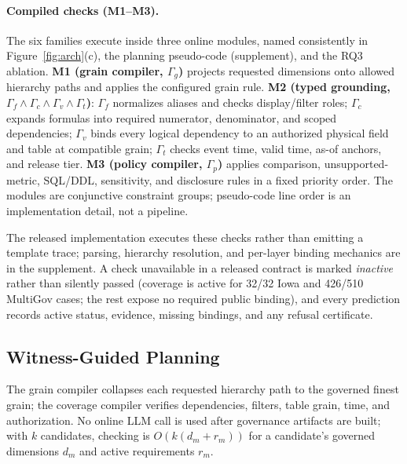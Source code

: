 \documentclass[letterpaper]{article}
\begin{document}
\paragraph{Compiled checks (M1--M3).}
The six families execute inside three online modules, named consistently in Figure~\ref{fig:arch}(c), the planning pseudo-code (supplement), and the RQ3 ablation. \textbf{M1 (grain compiler, $\Gamma_g$)} projects requested dimensions onto allowed hierarchy paths and applies the configured grain rule. \textbf{M2 (typed grounding, $\Gamma_f\land\Gamma_c\land\Gamma_v\land\Gamma_t$)}: $\Gamma_f$ normalizes aliases and checks display/filter roles; $\Gamma_c$ expands formulas into required numerator, denominator, and scoped dependencies; $\Gamma_v$ binds every logical dependency to an authorized physical field and table at compatible grain; $\Gamma_t$ checks event time, valid time, as-of anchors, and release tier. \textbf{M3 (policy compiler, $\Gamma_p$)} applies comparison, unsupported-metric, SQL/DDL, sensitivity, and disclosure rules in a fixed priority order. The modules are conjunctive constraint groups; pseudo-code line order is an implementation detail, not a pipeline.

The released implementation executes these checks rather than emitting a template trace; parsing, hierarchy resolution, and per-layer binding mechanics are in the supplement. A check unavailable in a released contract is marked \emph{inactive} rather than silently passed (coverage is active for 32/32 Iowa and 426/510 MultiGov cases; the rest expose no required public binding), and every prediction records active status, evidence, missing bindings, and any refusal certificate.

\subsection{Witness-Guided Planning}


The grain compiler collapses each requested hierarchy path to the governed finest grain; the coverage compiler verifies dependencies, filters, table grain, time, and authorization. No online LLM call is used after governance artifacts are built; with $k$ candidates, checking is $O(k(d_m+r_m))$ for a candidate's governed dimensions $d_m$ and active requirements $r_m$.
\end{document}

